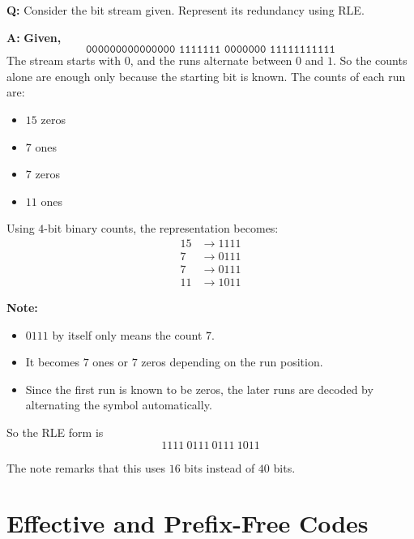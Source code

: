 \documentclass[11pt,a4paper]{book}
\newcounter{qna}[chapter]
\renewcommand{\theqna}{\thechapter.\arabic{qna}}
\newenvironment{questionanswerbox}[1][Example]{%
    \refstepcounter{qna}
    \begin{tcolorbox}[
        enhanced,
        breakable,
        colback=softlavender!10,
        colframe=softlavender!200,
        title={#1~\theqna},
        fonttitle=\bfseries,
        coltitle=white,
        colbacktitle=softlavender!200,
        sharp corners,
        boxrule=1pt,
        left=8pt,
        right=8pt,
        top=6pt,
        bottom=6pt
    ]
}{\end{tcolorbox}}
\begin{document}
\begin{questionanswerbox}[RLE Representation of a Bit Stream Example]
\textbf{Q:} Consider the bit stream given. Represent its redundancy using RLE.

\textbf{A:}
\textbf{Given,}
\[\texttt{000000000000000\ 1111111\ 0000000\ 11111111111}\]
The stream starts with \(0\), and the runs alternate between \(0\) and \(1\). So the counts alone are enough only because the starting bit is known. The counts of each run are:
\begin{itemize}
    \item \(15\) zeros
    \item \(7\) ones
    \item \(7\) zeros
    \item \(11\) ones
\end{itemize}

Using \(4\)-bit binary counts, the representation becomes:
\begin{align*}
15 &\to 1111\\
7  &\to 0111\\
7  &\to 0111\\
11 &\to 1011
\end{align*}

\textbf{Note:}
\begin{itemize}
    \item \(0111\) by itself only means the count \(7\).
    \item It becomes \(7\) ones or \(7\) zeros depending on the run position.
    \item Since the first run is known to be zeros, the later runs are decoded by alternating the symbol automatically.
\end{itemize}

So the RLE form is
\[
\boxed{1111\ 0111\ 0111\ 1011}
\]

The note remarks that this uses \(16\) bits instead of \(40\) bits.
\end{questionanswerbox}

\clearpage
\section{Effective and Prefix-Free Codes}
\end{document}

